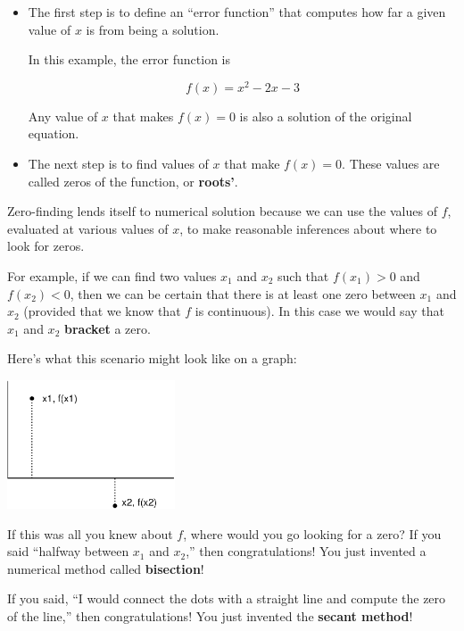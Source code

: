 \documentclass[
]{book}
\numberwithin{Answer}{chapter}
\numberwithin{Exercise}{chapter}
\begin{document}
\begin{itemize}

\item The first step is to define an ``error function'' that computes how far
a given value of $x$ is from being a solution.

In this example, the error function is

\begin{equation}
f(x) = x^2 - 2x -3
\end{equation}

Any value of $x$ that makes $f(x) = 0$ is also a solution
of the original equation.

\item The next step is to find values of $x$ that make
$f(x) = 0$.  These values are called zeros of the
function, or {\bf roots'}.

\end{itemize}

Zero-finding lends itself to numerical solution because we can
use the values of $f$, evaluated at various values of $x$, to
make reasonable inferences about where to look for zeros.

For example, if we can find two values $x_1$ and $x_2$ such that
$f(x_1) > 0$ and $f(x_2) < 0$, then we can be certain that there is at
least one zero between $x_1$ and $x_2$ (provided that we know that $f$
is continuous).  In this case we would say that $x_1$ and $x_2$
{\bf bracket} a zero.

Here's what this scenario might look like on a graph:

\beforefig \centerline{\includegraphics[height=1.5in]{figs/secant.eps}}

If this was all you knew about $f$, where would you go looking for
a zero?  If you said ``halfway between $x_1$ and $x_2$,'' then
congratulations!  You just invented a numerical method called
{\bf bisection}!

If you said, ``I would connect the dots with a straight line
and compute the zero of the line,'' then
congratulations!  You just invented the {\bf secant method}!
\end{document}
